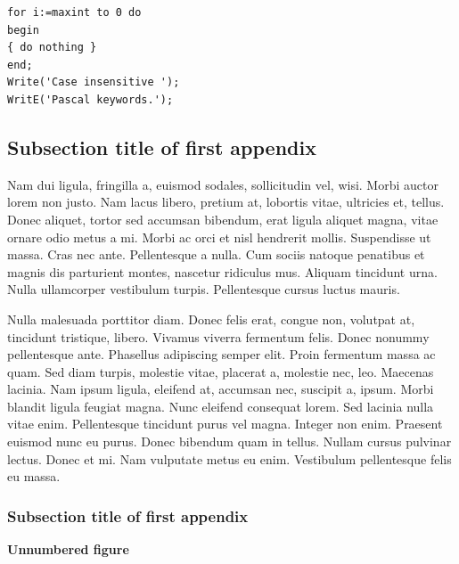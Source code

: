 \documentclass[APA,LATO1COL]{WileyNJD-v2}
\begin{document}
\begin{lstlisting}[caption={Descriptive Caption Text},label=DescriptiveLabel]
for i:=maxint to 0 do
begin
{ do nothing }
end;
Write('Case insensitive ');
WritE('Pascal keywords.');
\end{lstlisting}



\subsection{Subsection title of first appendix\label{app1.1a}}

Nam dui ligula, fringilla a, euismod sodales, sollicitudin vel, wisi. Morbi auctor lorem non justo. Nam lacus libero,
pretium at, lobortis vitae, ultricies et, tellus. Donec aliquet, tortor sed accumsan bibendum, erat ligula aliquet magna,
vitae ornare odio metus a mi. Morbi ac orci et nisl hendrerit mollis. Suspendisse ut massa. Cras nec ante. Pellentesque
a nulla. Cum sociis natoque penatibus et magnis dis parturient montes, nascetur ridiculus mus. Aliquam tincidunt
urna. Nulla ullamcorper vestibulum turpis. Pellentesque cursus luctus mauris.

Nulla malesuada porttitor diam. Donec felis erat, congue non, volutpat at, tincidunt tristique, libero. Vivamus
viverra fermentum felis. Donec nonummy pellentesque ante. Phasellus adipiscing semper elit. Proin fermentum massa
ac quam. Sed diam turpis, molestie vitae, placerat a, molestie nec, leo. Maecenas lacinia. Nam ipsum ligula, eleifend
at, accumsan nec, suscipit a, ipsum. Morbi blandit ligula feugiat magna. Nunc eleifend consequat lorem. Sed lacinia
nulla vitae enim. Pellentesque tincidunt purus vel magna. Integer non enim. Praesent euismod nunc eu purus. Donec
bibendum quam in tellus. Nullam cursus pulvinar lectus. Donec et mi. Nam vulputate metus eu enim. Vestibulum
pellentesque felis eu massa.

\subsubsection{Subsection title of first appendix\label{app1.1.1a}}

\noindent\textbf{Unnumbered figure}
\end{document}
